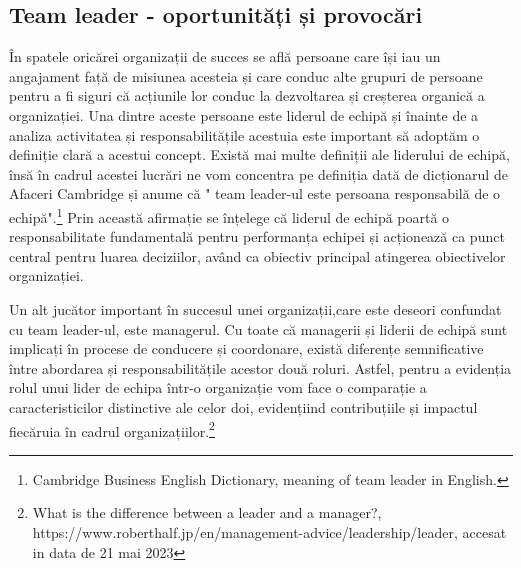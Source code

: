 \documentclass[a4paper, 12pt]{article}
\begin{document}
		\subsection{ Team leader - oportunități și provocări}

\quad\quad\space În spatele oricărei organizații de succes se află persoane care își iau un angajament față de misiunea acesteia și care conduc alte grupuri de persoane pentru a fi siguri că acțiunile lor conduc la dezvoltarea și creșterea organică a organizației. Una dintre aceste persoane este liderul de echipă și înainte de a analiza activitatea și responsabilitățile acestuia este important să adoptăm o definiție clară a acestui concept. Există mai multe definiții ale liderului de echipă, însă în cadrul acestei lucrări ne vom concentra pe definiția dată de dicționarul de Afaceri Cambridge și anume că " team leader-ul  este persoana responsabilă de o echipă".\footnote{Cambridge Business English Dictionary, meaning of team leader in English.} Prin această afirmație se înțelege că liderul de echipă poartă o responsabilitate fundamentală pentru performanța echipei și acționează ca punct central pentru luarea deciziilor, având ca obiectiv principal atingerea obiectivelor organizației.

	\quad\quad Un alt jucător important în succesul unei organizații,care este deseori confundat cu team leader-ul, este managerul. Cu toate că managerii și liderii de echipă sunt implicați în procese de conducere și coordonare, există diferențe semnificative între abordarea și responsabilitățile acestor două roluri. Astfel, pentru a evidenția rolul unui lider de echipa într-o organizație vom face o comparație a caracteristicilor distinctive ale celor doi, evidențiind contribuțiile și impactul fiecăruia în cadrul organizațiilor.\footnote{What is the difference between a leader and a manager?, https://www.roberthalf.jp/en/management-advice/leadership/leader, accesat in data de 21 mai 2023}
\newpage
\end{document}
